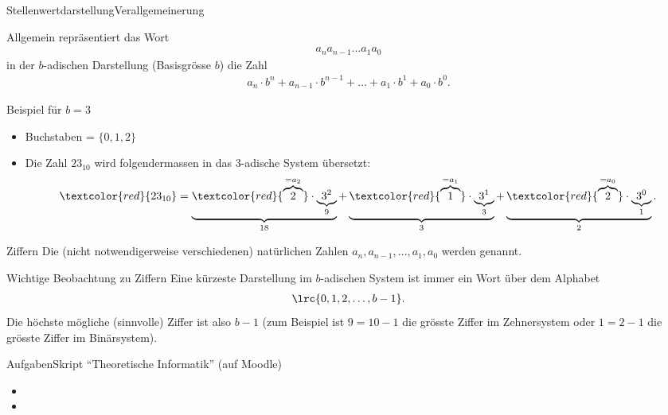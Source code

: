 \begin{frame}{Stellenwertdarstellung}{Verallgemeinerung}

Allgemein repräsentiert das Wort
    \begin{align*}
        a_na_{n-1}\ldots a_1a_0
    \end{align*}
    in der $b$-adischen Darstellung (Basisgrösse $b$) die Zahl
    \begin{align*}
        a_n\cdot b^n + a_{n-1}\cdot b^{n-1}+\ldots + a_1\cdot b^1 + a_0\cdot b^0.
    \end{align*}

    Beispiel für $b = 3$
    \begin{itemize}
        \item Buchstaben = $\{0,1,2\}$
        \item Die Zahl $23_{10}$ wird folgendermassen in das 3-adische System übersetzt:
        \begin{align*}
        \textcolor{red}{23_{10}}=\underbrace{\textcolor{red}{\overbrace{2}^{=a_2}}\cdot \underbrace{3^2}_{9}}_{18} + \underbrace{\textcolor{red}{\overbrace{1}^{=a_1}}\cdot \underbrace{3^1}_{3}}_{3} + \underbrace{\textcolor{red}{\overbrace{2}^{=a_0}}\cdot \underbrace{3^0}_{1}}_{2}.
    \end{align*}
    \end{itemize}
    
 \end{frame}

\begin{frame}{Ziffern}
Die (nicht notwendigerweise verschiedenen) natürlichen Zahlen $a_n,a_{n-1},\ldots,a_1,a_0$ werden  genannt.
\end{frame}

\begin{frame}{Wichtige Beobachtung zu Ziffern}
Eine kürzeste Darstellung im $b$-adischen System ist immer ein Wort über dem Alphabet
\begin{align*}
    \lrc{0,1,2,\ldots ,b-1}.
\end{align*}
Die höchste mögliche (sinnvolle) Ziffer ist also $b-1$ (zum Beispiel ist $9 = 10-1$ die grösste Ziffer im Zehnersystem oder $1 = 2-1$ die grösste Ziffer im Binärsystem).

\centering
\end{frame}

\begin{frame}{Aufgaben}{Skript ``Theoretische Informatik'' (auf Moodle)}
\begin{itemize}
    \item {}
    \item {}
\end{itemize}
\end{frame}

